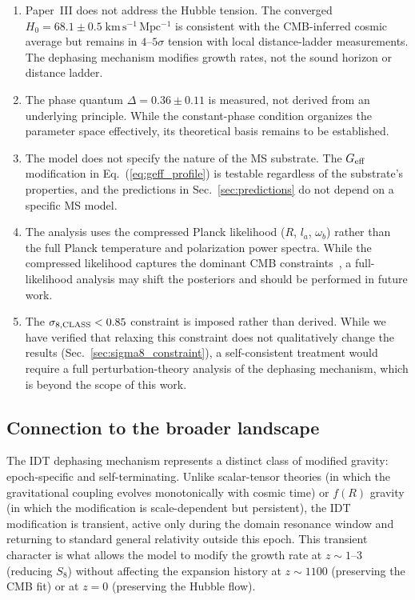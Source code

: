 \documentclass[aps,prd,twocolumn,superscriptaddress,nofootinbib]{revtex4-2}
\newcommand{\Geff}{G_{\rm eff}}
\newcommand{\Hubble}{H_0}
\begin{document}
\begin{enumerate}
\item Paper~III does not address the Hubble tension. The converged
  $\Hubble = 68.1 \pm 0.5\;\mathrm{km\,s^{-1}\,Mpc^{-1}}$ is
  consistent with the CMB-inferred cosmic average but remains in
  $4$--$5\sigma$ tension with local distance-ladder measurements.
  The dephasing mechanism modifies growth rates, not the sound
  horizon or distance ladder.
\item The phase quantum $\Delta = 0.36 \pm 0.11$ is measured, not
  derived from an underlying principle. While the constant-phase
  condition organizes the parameter space effectively, its
  theoretical basis remains to be established.
\item The model does not specify the nature of the MS substrate.
  The $\Geff$ modification in Eq.~(\ref{eq:geff_profile}) is
  testable regardless of the substrate's properties, and the
  predictions in Sec.~\ref{sec:predictions} do not depend on a
  specific MS model.
\item The analysis uses the compressed Planck likelihood ($R$, $l_a$,
  $\omega_b$) rather than the full Planck temperature and
  polarization power spectra. While the compressed likelihood captures
  the dominant CMB constraints~\cite{Planck2018}, a full-likelihood
  analysis may shift the posteriors and should be performed in
  future work.
\item The $\sigma_{8,\rm CLASS} < 0.85$ constraint is imposed rather
  than derived. While we have verified that relaxing this constraint
  does not qualitatively change the results
  (Sec.~\ref{sec:sigma8_constraint}), a self-consistent treatment
  would require a full perturbation-theory analysis of the dephasing
  mechanism, which is beyond the scope of this work.
\end{enumerate}

\subsection{Connection to the broader landscape}
\label{sec:landscape}

The IDT dephasing mechanism represents a distinct class of modified
gravity: epoch-specific and self-terminating. Unlike scalar-tensor
theories (in which the gravitational coupling evolves monotonically
with cosmic time) or $f(R)$ gravity (in which the modification is
scale-dependent but persistent), the IDT modification is transient,
active only during the domain resonance window and returning to
standard general relativity outside this epoch. This transient
character is what allows the model to modify the growth rate at
$z \sim 1$--$3$ (reducing $S_8$) without affecting the expansion
history at $z \sim 1100$ (preserving the CMB fit) or at $z = 0$
(preserving the Hubble flow).
\end{document}
